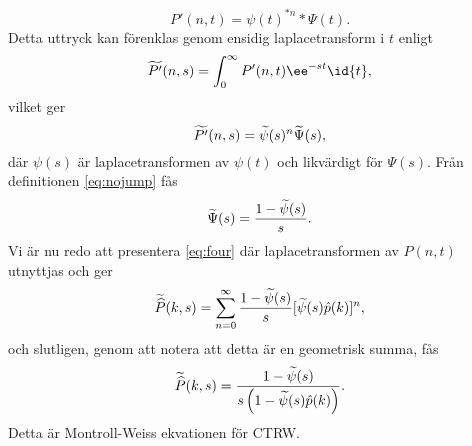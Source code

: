 \begin{equation}
P'(n,t) = \psi(t)^{*n}*\Psi(t).
\end{equation}
Detta uttryck kan förenklas genom ensidig laplacetransform i $t$ enligt 
\begin{equation}
\PPs (n,s) = \int_0^\infty P'(n,t)\ee^{-st}\id{t},
\end{equation}
vilket ger 
\begin{equation}
\widetilde{P'} (n,s) = \widetilde{\psi}(s)^n\widetilde{\Psi}(s),
\end{equation}
där $\psi(s)$ är laplacetransformen av $\psi(t)$ och likvärdigt för $\Psi(s)$. Från definitionen \eqref{eq:nojump} fås 
\begin{equation}
\widetilde{\Psi}(s) = \frac{1-\widetilde{\psi} (s)}{s}.
\end{equation}
Vi är nu redo att presentera \eqref{eq:four} där laplacetransformen av $P(n,t)$ utnyttjas och ger 
\begin{equation}
\widetilde{\widehat{P}} (k,s) = \sum_{n=0}^{\infty} \frac{1-\widetilde{\psi} (s)}{s}[\widetilde{\psi} (s)\hat{p} (k)]^n,
\end{equation}
och slutligen, genom att notera att detta är en geometrisk summa, fås 
\begin{equation}\label{eq:master}
\widetilde{\widehat{P}} (k,s) = \frac{1-\widetilde{\psi} (s)}{s\left(1-\widetilde{\psi} (s)\hat{p} (k)\right)}.
\end{equation}
Detta är Montroll-Weiss ekvationen för CTRW.


